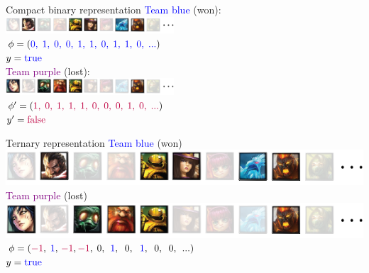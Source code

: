 \begin{frame}{Compact binary representation}
\centering
\textcolor{blue}{Team blue} (won):\\
\hspace{20pt}\includegraphics[width=0.47\textwidth]{img/kent/pickblue.png}\\
\vspace{8pt}
$\phi = (\textcolor{blue}{0,\;1,\;0,\;0,\;1,\;1,\;0,\;1,\;1,\;0,\;...})$\\
$y = \textcolor{blue}{\text{true}}$\\
\vspace{40pt}
\textcolor{purple}{Team purple} (lost):\\
\hspace{20pt}\includegraphics[width=0.47\textwidth]{img/kent/pickpurple.png}\\
\vspace{8pt}
$\phi' = (\textcolor{purple}{1,\;0,\;1,\;1,\;1,\;0,\;0,\;0,\;1,\;0,\;...})$\\
$y' = \textcolor{purple}{\text{false}}$
\end{frame}

\begin{frame}{Ternary representation}
\centering
\textcolor{blue}{Team blue} (won)\\
\hspace{20pt}\includegraphics[scale=0.31]{img/kent/pickblue.png}\\
\vspace{20pt}
\textcolor{purple}{Team purple} (lost)\\
\hspace{20pt}\includegraphics[scale=0.31]{img/kent/pickpurple.png}\\
\vspace{20pt}
$\phi = (\textcolor{purple}{-1},\;\textcolor{blue}{1},\,\textcolor{purple}{-1},\textcolor{purple}{-1},\;0,\;\,\textcolor{blue}{1},\;\;0,\;\,\,\textcolor{blue}{1},\;\;0,\;\;0,\;\,...)$\\
$y = \textcolor{blue}{\text{true}}$\\
\end{frame}

